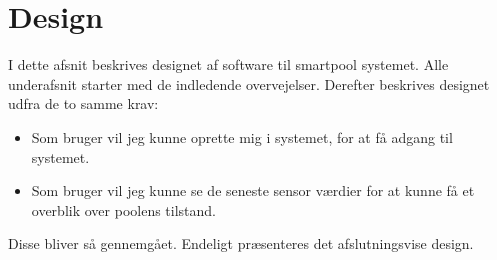 \chapter{Design}\label{cha:design}

I dette afsnit beskrives designet af software til \gls{smartpool} systemet. Alle underafsnit starter med de indledende overvejelser. Derefter beskrives designet udfra de to samme krav: 

\begin{itemize}
	\item Som bruger vil jeg kunne oprette mig i systemet, for at få adgang til systemet.
	\item Som bruger vil jeg kunne se de seneste sensor værdier for at kunne få et overblik over 
	poolens tilstand.
\end{itemize}

Disse bliver så gennemgået. Endeligt præsenteres det afslutningsvise design.



